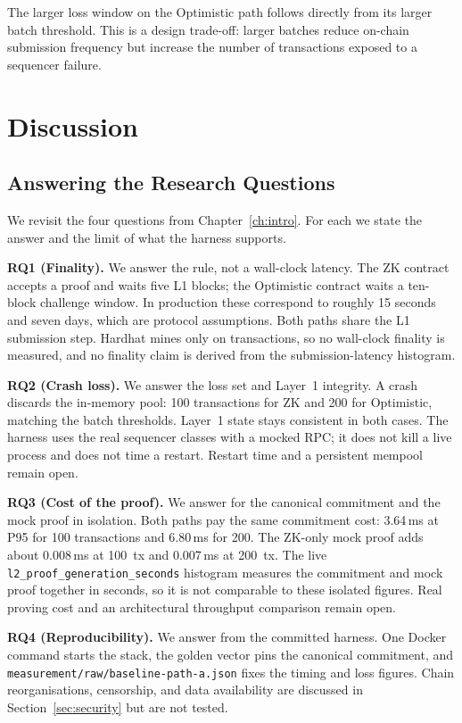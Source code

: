 The larger loss window on the Optimistic path follows directly from its larger batch threshold. This is a design trade-off: larger batches reduce on-chain submission frequency but increase the number of transactions exposed to a sequencer failure.

\section{Discussion}

\subsection{Answering the Research Questions}

We revisit the four questions from Chapter~\ref{ch:intro}. For each we state the answer and the limit of what the harness supports.

\textbf{RQ1 (Finality).} We answer the rule, not a wall-clock latency. The ZK contract accepts a proof and waits five L1 blocks; the Optimistic contract waits a ten-block challenge window. In production these correspond to roughly 15 seconds and seven days, which are protocol assumptions. Both paths share the L1 submission step. Hardhat mines only on transactions, so no wall-clock finality is measured, and no finality claim is derived from the submission-latency histogram.

\textbf{RQ2 (Crash loss).} We answer the loss set and Layer~1 integrity. A crash discards the in-memory pool: 100 transactions for ZK and 200 for Optimistic, matching the batch thresholds. Layer~1 state stays consistent in both cases. The harness uses the real sequencer classes with a mocked RPC; it does not kill a live process and does not time a restart. Restart time and a persistent mempool remain open.

\textbf{RQ3 (Cost of the proof).} We answer for the canonical commitment and the mock proof in isolation. Both paths pay the same commitment cost: 3.64\,ms at P95 for 100 transactions and 6.80\,ms for 200. The ZK-only mock proof adds about 0.008\,ms at 100~tx and 0.007\,ms at 200~tx. The live \texttt{l2\_proof\_generation\_seconds} histogram measures the commitment and mock proof together in seconds, so it is not comparable to these isolated figures. Real proving cost and an architectural throughput comparison remain open.

\textbf{RQ4 (Reproducibility).} We answer from the committed harness. One Docker command starts the stack, the golden vector pins the canonical commitment, and \texttt{measurement/raw/baseline-path-a.json} fixes the timing and loss figures. Chain reorganisations, censorship, and data availability are discussed in Section~\ref{sec:security} but are not tested.

